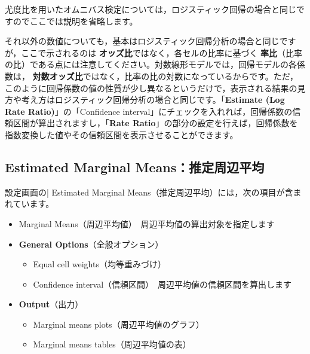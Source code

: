 \documentclass[
  12pt,
  a5jpaper,
  lualatex, ja=standard]{bxjsbook}
\providecommand{\tightlist}{%
  \setlength{\itemsep}{0pt}\setlength{\parskip}{0pt}}
\renewcommand{\emph}[1]{\textbf{\color{emph} #1}}
\newenvironment{jmvsettings}{%
	\begin{center}%
	\begin{tcolorbox}[%
		title=設定項目,
		colframe=gmoji,
		colbacktitle=gmoji,
		colback=gmoji!2!white,
		breakable,
		width=.9\textwidth,
		]\small\addtolength{\leftmargini}{-3\labelsep}%
	}%
	{\end{tcolorbox}\end{center}}
\begin{document}
尤度比を用いたオムニバス検定については，ロジスティック回帰の場合と同じですのでここでは説明を省略します。

それ以外の数値についても，基本はロジスティック回帰分析の場合と同じですが，ここで示されるのは\emph{オッズ比}ではなく，各セルの比率に基づく\emph{率比}（比率の比）である点には注意してください。対数線形モデルでは，回帰モデルの各係数は，\emph{対数オッズ比}ではなく，比率の比の対数になっているからです。ただ，このように回帰係数の値の性質が少し異なるというだけで，表示される結果の見方や考え方はロジスティック回帰分析の場合と同じです。「\textbf{Estimate (Log Rate Ratio)}」の「Confidence interval」にチェックを入れれば，回帰係数の信頼区間が算出されますし，「\textbf{Rate Ratio}」の部分の設定を行えば，回帰係数を指数変換した値やその信頼区間を表示させることができます。

\hypertarget{sub:frequencies-loglin-emm}{%
\subsection{Estimated Marginal Means：推定周辺平均}\label{sub:frequencies-loglin-emm}}

設定画面の\colorbox{bar}{\textcolor{gmoji2}{| Estimated Marginal Means}}（推定周辺平均）には，次の項目が含まれています。

\begin{jmvsettings}

\begin{itemize}
\tightlist
\item
  Marginal Means（周辺平均値）　周辺平均値の算出対象を指定します
\item
  \textbf{General Options}（全般オプション）

  \begin{itemize}
  \tightlist
  \item
    Equal cell weights（均等重みづけ）
  \item
    Confidence interval（信頼区間）　周辺平均値の信頼区間を算出します
  \end{itemize}
\item
  \textbf{Output}（出力）

  \begin{itemize}
  \tightlist
  \item
    Marginal means plots（周辺平均値のグラフ）
  \item
    Marginal means tables（周辺平均値の表）
  \end{itemize}
\end{itemize}

\end{jmvsettings}
\end{document}
